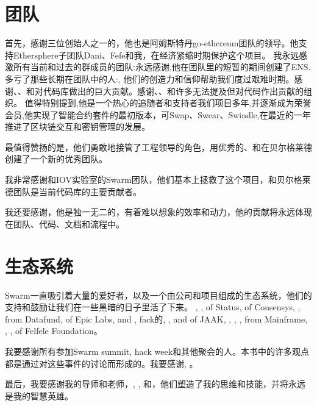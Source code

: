 \section*{团队}

首先，感谢三位创始人之一的，他也是阿姆斯特丹go-ethereum团队的领导。他支持Ethersphere子团队Dani、Fefe和我，在经济紧缩时期保护这个项目。
我永远感激所有当前和过去的群成员的团队:永远感谢,他在团队里的短暂的期间创建了ENS.多亏了那些长期在团队中的人:,  他们的创造力和信仰帮助我们度过艰难时期。感谢、、和对代码库做出的巨大贡献。感谢、、和许多无法提及但对代码作出贡献的组织。
值得特别提到,他是一个热心的追随者和支持者我们项目多年,并逐渐成为荣誉会员,他实现了智能合约套件的最初版本，可Swap、Swear、Swindle,在最近的一年推进了区块链交互和密钥管理的发展。

最值得赞扬的是，他们勇敢地接管了工程领导的角色，用优秀的、和在贝尔格莱德创建了一个新的优秀团队。 

我非常感谢和IOV实验室的Swarm团队，他们基本上拯救了这个项目，和贝尔格莱德团队是当前代码库的主要贡献者。 

我还要感谢，他是独一无二的，有着难以想象的效率和动力，他的贡献将永远体现在团队、代码、文档和流程中。

\section*{生态系统}

Swarm一直吸引着大量的爱好者，以及一个由公司和项目组成的生态系统，他们的支持和鼓励让我们在一些黑暗的日子里活了下来。 
, ,  of Status,  of Consensys, ,  from Datafund,  of Epic Labs,  and , fack的, ,  and  of JAAK, , , ,  from Mainframe, , ,  of Felfele Foundation。 

我要感谢所有参加Swarm summit, hack week和其他聚会的人。本书中的许多观点都是通过对这些事件的讨论而形成的。我要感谢, 。

最后，我要感谢我的导师和老师，, , 和，他们塑造了我的思维和技能，并将永远是我的智慧英雄。

